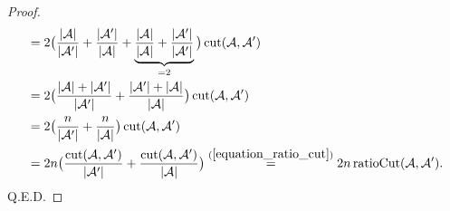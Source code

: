 \documentclass[lang=cn,10pt]{gorgeousnbook}
\numberwithin{equation}{section}%
\numberwithin{figure}{section}%
\begin{document}
\begin{proof}
\begin{align*}
&= 2 \big(\frac{|\mathcal{A}|}{|\mathcal{A}'|} + \frac{|\mathcal{A}'|}{|\mathcal{A}|} + \underbrace{\frac{|\mathcal{A}|}{|\mathcal{A}|} + \frac{|\mathcal{A}'|}{|\mathcal{A}'|}}_{=2} \big)\, \text{cut}(\mathcal{A}, \mathcal{A}') \\
&= 2 \big( \frac{|\mathcal{A}| + |\mathcal{A}'|}{|\mathcal{A}'|} + \frac{|\mathcal{A}'| + |\mathcal{A}|}{|\mathcal{A}|} \big)\, \text{cut}(\mathcal{A}, \mathcal{A}') \\
&= 2 \big( \frac{n}{|\mathcal{A}'|} + \frac{n}{|\mathcal{A}|} \big)\, \text{cut}(\mathcal{A}, \mathcal{A}') \\
&= 2 n \big( \frac{\text{cut}(\mathcal{A}, \mathcal{A}')}{|\mathcal{A}'|} + \frac{\text{cut}(\mathcal{A}, \mathcal{A}')}{|\mathcal{A}|} \big) \overset{(\ref{equation_ratio_cut})}{=} 2n\, \text{ratioCut}(\mathcal{A}, \mathcal{A}').
\end{align*}
Q.E.D.
\end{proof}
\end{document}
